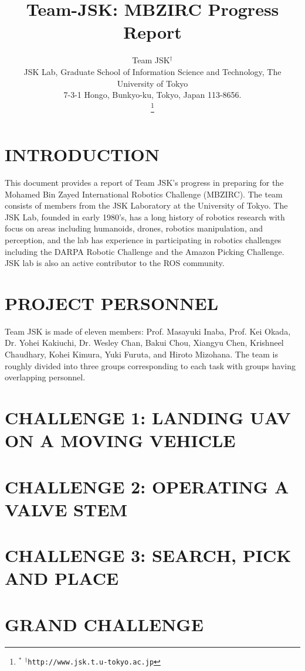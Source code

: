\documentclass[letterpaper, 10 pt, conference]{ieeeconf}  %
\title{\LARGE \bf
  Team-JSK: MBZIRC Progress Report
}
\author{Team JSK$^\dagger$%
  \\ JSK Lab, Graduate School of Information Science and Technology, The University of Tokyo \\
  7-3-1 Hongo, Bunkyo-ku, Tokyo, Japan 113-8656.  \\
\thanks{$^{*}$ %
{$^\dagger$\tt\small http://www.jsk.t.u-tokyo.ac.jp}
}}
\begin{document}
\maketitle
\thispagestyle{empty}
\pagestyle{empty}


\section{INTRODUCTION}
This document provides a report of Team JSK's progress in preparing
for the Mohamed Bin Zayed International Robotics Challenge
(MBZIRC). The team consists of members from the JSK Laboratory at the
University of Tokyo. The JSK Lab, founded in early 1980’s, has a long
history of robotics research with focus on areas including humanoids,
drones, robotics manipulation, and perception, and the lab has
experience in participating in robotics challenges including the DARPA
Robotic Challenge and the Amazon Picking Challenge. JSK lab is also an
active contributor to the ROS community.


\section{PROJECT PERSONNEL}
Team JSK is made of eleven members: Prof. Masayuki Inaba, Prof. Kei
Okada, Dr. Yohei Kakiuchi, Dr. Wesley Chan, Bakui Chou, Xiangyu Chen,
Krishneel Chaudhary, Kohei Kimura, Yuki Furuta, and Hiroto
Mizohana. The team is roughly divided into three groups corresponding
to each task with groups having overlapping personnel.




\section{CHALLENGE 1: LANDING UAV ON A MOVING VEHICLE}




\section{CHALLENGE 2: OPERATING A VALVE STEM}


\section{CHALLENGE 3: SEARCH, PICK AND PLACE}


\section{GRAND CHALLENGE}


\end{document}
